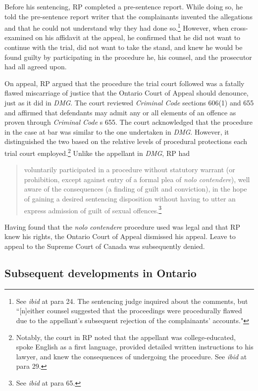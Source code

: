 Before his sentencing, RP completed a pre-sentence report. While doing so, he told the pre-sentence report writer that the complainants invented the allegations and that he could not understand why they had done so.\footnote{See \textit{ibid} at para 24. The sentencing judge inquired about the comments, but ``[n]either counsel suggested that the proceedings were procedurally flawed due to the appellant's subsequent rejection of the complainants' accounts."} However, when cross-examined on his affidavit at the appeal, he confirmed that he did not want to continue with the trial, did not want to take the stand, and knew he would be found guilty by participating in the procedure he, his counsel, and the prosecutor had all agreed upon.

On appeal, RP argued that the procedure the trial court followed was a fatally flawed miscarriage of justice that the Ontario Court of Appeal should denounce, just as it did in \textit{DMG}. The court reviewed \textit{Criminal Code} sections 606(1) and 655 and affirmed that defendants may admit any or all elements of an offence as proven through \textit{Criminal Code} s 655. The court acknowledged that the procedure in the case at bar was similar to the one undertaken in \textit{DMG}. However, it distinguished the two based on the relative levels of procedural protections each trial court employed.\footnote{Notably, the court in RP noted that the appellant was college-educated, spoke English as a first language, provided detailed written instructions to his lawyer, and knew the consequences of undergoing the procedure. See \textit{ibid} at para 29.} Unlike the appellant in \textit{DMG}, RP had 

\begin{quote}
    \singlespacing
    voluntarily participated in a procedure without statutory warrant (or prohibition, except against entry of a formal plea of \textit{nolo contendere}), well aware of the consequences (a finding of guilt and conviction), in the hope of gaining a desired sentencing disposition without having to utter an express admission of guilt of sexual offences.\footnote{See \textit{ibid} at para 65.}
\end{quote} Having found that the \textit{nolo contendere} procedure used was legal and that RP knew his rights, the Ontario Court of Appeal dismissed his appeal. Leave to appeal to the Supreme Court of Canada was subsequently denied.

\subsection{Subsequent developments in Ontario}


